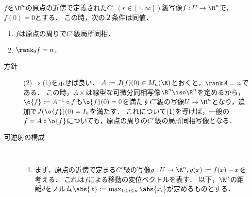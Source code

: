 \documentclass[uplatex,dvipdfmx]{jsreport}
\begin{document}
\begin{theorem}[逆写像定理]
    $f$を$\R^n$の原点の近傍で定義された$C^r\;(r\in[1,\infty])$級写像$f:U\to\R^n$で，$f(0)=0$とする．
    この時，次の２条件は同値．
    \begin{enumerate}
        \item $f$は原点の周りで$C^r$級局所同相．
        \item $\rank_0f=n$．
    \end{enumerate}
\end{theorem}
\begin{Proof}\mbox{}
    \begin{description}
        \item[方針] 
        (2)$\Rightarrow$(1)を示せば良い．
        $A:=J(f)(0)\in M_n(\R)$とおくと，$\rank A=n$である．
        この時，$A\times$は線型な可微分同相写像$\R^n\iso\R^n$を定めるから，$\o{f}:=A^{-1}\circ f$も$\o{f}(0)=0$を満たす$C^r$級の写像$U\to\R^n$となり，追加で$J(\o{f})(0)=I_n$を満たす．
        これについて(1)を導けば，一般の$f=A\circ\o{f}$についても，原点の周りの$C^r$級の局所同相写像となる．
        \item[可逆射の構成] \mbox{}\\
        \begin{enumerate}
            \item まず，原点の近傍で定まる$C^r$級の写像$g:U\to\R^n,g(x):=f(x)-x$を考える．
            これは$f$による移動の変位ベクトルを表す．
            以下，$\R^n$の距離$d$をノルム$\abs{x}:=\max_{1\le i\le n}\abs{x_i}$が定めるものとする．


\end{enumerate}
\end{description}
\end{Proof}
\end{document}
